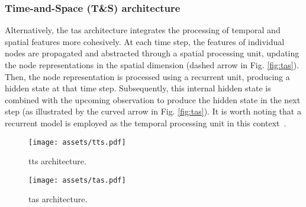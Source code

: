 \subsubsection{Time-and-Space (T\&S) architecture}\label{subsubsec:tas}
Alternatively, the \acrshort{tas} architecture integrates the processing of temporal and spatial features more cohesively. At each time step, the features of individual nodes are propagated and abstracted through a spatial processing unit, updating the node representations in the spatial dimension (dashed arrow in Fig. \ref{fig:tas}). Then, the node representation is processed using a recurrent unit, producing a hidden state at that time step.  
Subsequently, this internal hidden state is combined with the upcoming observation to produce the hidden state in the next step (as illustrated by the curved arrow in Fig. \ref{fig:tas}). It is worth noting that a recurrent model is employed as the temporal processing unit in this context~\cite{gao_equivalence_2022}.



\begin{figure}[ht]
    \centering
    \begin{minipage}[t]{0.46\textwidth} %
        \centering
        \texttt{[image: assets/tts.pdf]} %
        \caption{\acrshort{tts} architecture.}
        \label{fig:tts}
    \end{minipage}
    \hfill %
    \begin{minipage}[t]{0.48\textwidth} %
        \centering
        \texttt{[image: assets/tas.pdf]} %
        \caption{\acrshort{tas} architecture.}
        \label{fig:tas}
    \end{minipage}
    \label{fig:architectures}
\end{figure}


